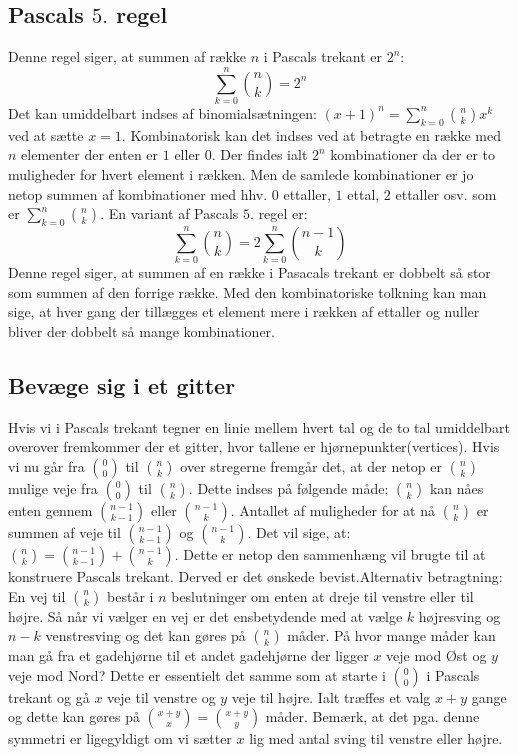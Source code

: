 \subsection{Pascals \(5.\) regel}
Denne regel siger, at summen af række \(n\) i Pascals trekant er \(2^{n}\):
\begin{equation}
\sum_{k=0}^{n}\binom{n}{k}=2^{n}
\end{equation}
Det kan umiddelbart indses af binomialsætningen: \((x+1)^{n}=\sum_{k=0}^{n}\binom{n}{k}x^{k}\) ved at sætte \(x=1\). Kombinatorisk kan det indses ved at betragte en række med \(n\) elementer der enten er \(1\) eller \(0\). Der findes ialt \(2^{n}\) kombinationer da der er to muligheder for hvert element i rækken. Men de samlede kombinationer er jo netop summen af kombinationer med hhv. \(0\) ettaller, \(1\) ettal, \(2\) ettaller osv. som er
 \(\sum_{k=0}^{n}\binom{n}{k}\). En variant af Pascals \(5.\) regel er:
\begin{equation}
\sum_{k=0}^{n}\binom{n}{k}=2\sum_{k=0}^{n}\binom{n-1}{k}
\end{equation}
Denne regel siger, at summen af en række i Pasacals trekant er dobbelt så stor som summen af den forrige række. Med den kombinatoriske tolkning kan man sige, at hver gang der tillægges et element mere i rækken af ettaller og nuller bliver der dobbelt så mange kombinationer.
\subsection{Bevæge sig i et gitter}
Hvis vi i Pascals trekant tegner en linie mellem hvert tal og de to tal umiddelbart overover fremkommer der et gitter, hvor tallene er hjørnepunkter(vertices). Hvis vi nu går fra \(\binom{0}{0}\) til \(\binom{n}{k}\) over stregerne fremgår det, at der netop er \(\binom{n}{k}\) mulige veje fra \(\binom{0}{0}\) til \(\binom{n}{k}\). Dette indses på følgende måde: \(\binom{n}{k}\) kan nåes enten gennem \(\binom{n-1}{k-1}\) eller \(\binom{n-1}{k}\). Antallet af muligheder for at nå \(\binom{n}{k}\) er summen af veje til \(\binom{n-1}{k-1}\) og \(\binom{n-1}{k}\). Det vil sige, at: \(\binom{n}{k}=\binom{n-1}{k-1}+\binom{n-1}{k}\). Dette er netop den sammenhæng vil brugte til at konstruere Pascals trekant. Derved er det ønskede bevist.Alternativ betragtning: En vej til \(\binom{n}{k}\) består i \(n\) beslutninger om enten at dreje til venstre eller til højre. Så når vi vælger en vej er det ensbetydende med at vælge \(k\) højresving og \(n-k\) venstresving og det kan gøres på \(\binom{n}{k}\) måder. På hvor mange måder kan man gå fra et gadehjørne til et andet gadehjørne der ligger \(x\) veje mod Øst og \(y\) veje mod Nord? Dette er essentielt det samme som at starte i \(\binom{0}{0}\) i Pascals trekant og gå \(x\) veje til venstre og \(y\) veje til højre. Ialt træffes et valg \(x+y\) gange og dette kan gøres på \(\binom{x+y}{x}=\binom{x+y}{y}\) måder. Bemærk, at det pga. denne symmetri er ligegyldigt om vi sætter \(x\) lig med antal sving til venstre eller højre.
